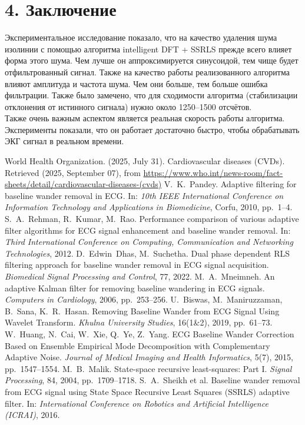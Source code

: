 \documentclass[10pt,a5paper]{article}
\numberwithin{figure}{section}
\numberwithin{table}{section}
\begin{document}
\section{4. Заключение}
Экспериментальное исследование показало, что на качество удаления шума изолинии с помощью алгоритма intelligent DFT + SSRLS прежде всего влияет форма этого шума. Чем лучше он аппроксимируется синусоидой, тем чище будет отфильтрованный сигнал. Также на качество работы реализованного алгоритма влияют амплитуда и частота шума. Чем они больше, тем больше ошибка фильтрации. Также было замечено, что для сходимости алгоритма (стабилизации отклонения от истинного сигнала) нужно около 1250–1500 отсчётов.\\
Также очень важным аспектом является реальная скорость работы алгоритма. Эксперименты показали, что он работает достаточно быстро, чтобы обрабатывать ЭКГ сигнал в реальном времени.

\begin{thebibliography}{10}
 World Health Organization. (2025, July 31). Cardiovascular diseases (CVDs). Retrieved (2025, September 07), from \url{https://www.who.int/news-room/fact-sheets/detail/cardiovascular-diseases-(cvds)}
 V.~K.~Pandey. Adaptive filtering for baseline wander removal in ECG. In: \textit{10th IEEE International Conference on Information Technology and Applications in Biomedicine}, Corfu, 2010, pp.~1--4.
 S.~A.~Rehman, R.~Kumar, M.~Rao. Performance comparison of various adaptive filter algorithms for ECG signal enhancement and baseline wander removal. In: \textit{Third International Conference on Computing, Communication and Networking Technologies}, 2012.
 D.~Edwin~Dhas, M.~Suchetha. Dual phase dependent RLS filtering approach for baseline wander removal in ECG signal acquisition. \textit{Biomedical Signal Processing and Control}, 77, 2022.
 M.~A.~Mneimneh. An adaptive Kalman filter for removing baseline wandering in ECG signals. \textit{Computers in Cardiology}, 2006, pp.~253--256.
 U.~Biswas, M.~Maniruzzaman, B.~Sana, K.~R.~Hasan. Removing Baseline Wander from ECG Signal Using Wavelet Transform. \textit{Khulna University Studies}, 16(1\&2), 2019, pp.~61--73.
 W.~Huang, N.~Cai, W.~Xie, Q.~Ye, Z.~Yang. ECG Baseline Wander Correction Based on Ensemble Empirical Mode Decomposition with Complementary Adaptive Noise. \textit{Journal of Medical Imaging and Health Informatics}, 5(7), 2015, pp.~1547--1554.
 M.~B.~Malik. State-space recursive least-squares: Part I. \textit{Signal Processing}, 84, 2004, pp.~1709--1718.
 S.~A.~Sheikh et al. Baseline wander removal from ECG signal using State Space Recursive Least Squares (SSRLS) adaptive filter. In: \textit{International Conference on Robotics and Artificial Intelligence (ICRAI)}, 2016.
\end{thebibliography}
\end{document}
